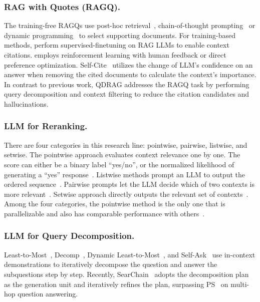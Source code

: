 \documentclass[letterpaper]{article} %
\begin{document}
\subsubsection{RAG with Quotes (RAGQ).}

The training-free RAGQs use post-hoc retrieval~\cite{gao-etal-2023-enabling}, chain-of-thought prompting~\cite{ji2024chain} or dynamic programming~\cite{choi2025trustworthy} to select supporting documents.
For training-based methods, \cite{asai2024selfrag,xia-etal-2025-ground} perform supervised-finetuning on RAG LLMs to enable context citations. 
\cite{huang-etal-2024-learning,song2025measuring} employs reinforcement learning with human feedback or direct preference optimization. 
Self-Cite~\cite{chuang2025selfcite} utilizes the change of LLM's confidence on an answer when removing the cited documents to calculate the context's importance.
In contrast to previous work, QDRAG addresses the RAGQ task by performing query decomposition and context filtering to reduce the citation candidates and hallucinations. 

\subsubsection{LLM for Reranking.}

There are four categories in this research line: pointwise, pairwise, listwise, and setwise. The pointwise approach evaluates context relevance one by one. The score can either be a binary label ``yes/no'', or the normalized likelihood of generating a ``yes'' response~\cite{zhu2025accelerating, yu2024rankrag}. Listwise methods prompt an LLM to output the ordered sequence~\cite{sun-etal-2023-chatgpt}. Pairwise prompts let the LLM decide which of two contexts is more relevant~\cite{qin-etal-2024-large}. 
Setwise approach directly outputs the relevant set of contexts~\cite{10.1145/3626772.3657813,yu2024rankrag}. Among the four categories, the pointwise method is the only one that is parallelizable and also has comparable performance with others~\cite{10.1145/3626772.3657813}.


\subsubsection{LLM for Query Decomposition.}

Least-to-Most~\cite{DBLP:conf/iclr/ZhouSHWS0SCBLC23}, Decomp~\cite{khot2023decomposed}, Dynamic Least-to-Most~\cite{DBLP:conf/iclr/DrozdovSASSCBZ23}, and Self-Ask~\cite{press-etal-2023-measuring} use in-context demonstrations to iteratively decompose the question and answer the subquestions step by step. 
Recently, SearChain~\cite{xu2024search} adopts the decomposition plan as the generation unit and iteratively refines the plan, surpassing PS~\cite{DBLP:conf/acl/WangXLHLLL23} on multi-hop question answering. 
\end{document}
